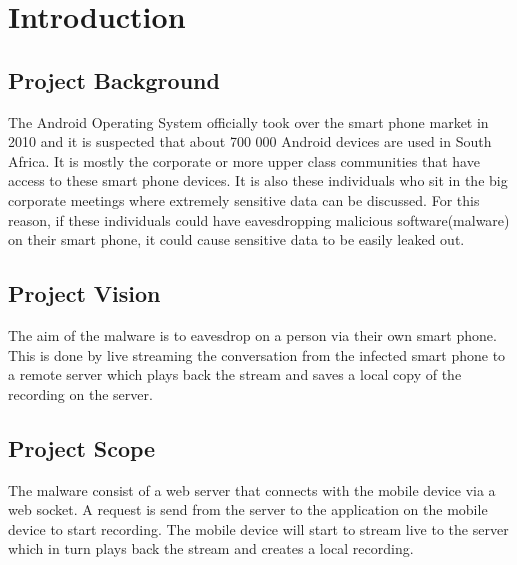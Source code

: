\begin{comment}
\documentclass[a4paper,12pt,titlepage]{article}
\usepackage{verbatim}

\usepackage{graphicx}
\usepackage[utf8]{inputenc}
\usepackage{hyperref}
\DeclareGraphicsExtensions{.jpg}
\graphicspath{{./Images/}}
\end{comment}


	
\newpage
\tableofcontents
\newpage
	\section{Introduction}
	\subsection{Project Background}

The Android Operating System officially took over the smart phone market in 2010 and it is suspected that about 700 000 Android devices are used in South Africa. It is mostly the corporate or more upper class communities that have access to these smart phone devices. It is also these individuals who sit in the big corporate meetings where extremely sensitive data can be discussed. For this reason, if these individuals could have eavesdropping malicious software(malware) on their smart phone, it could cause sensitive data to be easily leaked out.


		\subsection{Project Vision}
The aim of the malware is to eavesdrop on a person via their own smart phone. This is done by live streaming the conversation from the infected smart phone to a remote server which plays back the stream and saves a local copy of the recording on the server.
		\subsection{Project Scope}
The malware consist of a web server that connects with the mobile device via a web socket. A request is send from the server to the application on the mobile device to start recording. The mobile device will start to stream live to the server which in turn plays back the stream and creates a local recording.









	



	




